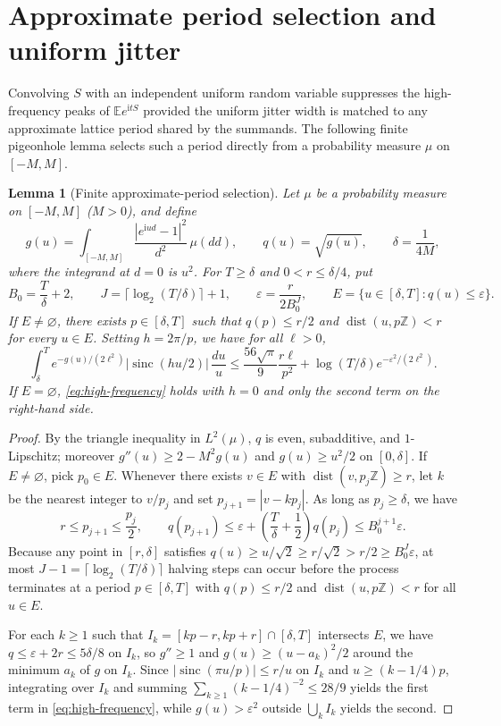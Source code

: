 \documentclass[11pt]{article}
\numberwithin{equation}{section}
\newtheorem{lemma}[theorem]{Lemma}
\theoremstyle{remark}
\DeclareMathOperator{\sinc}{sinc}
\DeclareMathOperator{\dist}{dist}
\newcommand{\E}{\mathbb E}
\newcommand{\Z}{\mathbb Z}
\newcommand{\eps}{\varepsilon}
\newcommand{\ii}{\mathrm i}
\begin{document}
\section{Approximate period selection and uniform jitter}\label{sec:jitter}

Convolving $S$ with an independent uniform random variable suppresses the
high-frequency peaks of $\E e^{\ii tS}$ provided the uniform jitter width is
matched to any approximate lattice period shared by the summands. The
following finite pigeonhole lemma selects such a period directly from a
probability measure $\mu$ on $[-M,M]$.

\begin{lemma}[Finite approximate-period selection]\label{lem:period}
Let $\mu$ be a probability measure on $[-M,M]$ ($M>0$), and define
\[
 g(u)=\int_{[-M,M]}\frac{|e^{\ii ud}-1|^2}{d^2}\,\mu(dd),\qquad
 q(u)=\sqrt{g(u)},\qquad\delta=\frac1{4M},
\]
where the integrand at $d=0$ is $u^2$. For $T\ge\delta$ and $0<r\le\delta/4$,
put
\[
 B_0=\frac T\delta+2,\qquad J=\lceil\log_2(T/\delta)\rceil+1,\qquad
 \eps=\frac r{2B_0^J},\qquad E=\{u\in[\delta,T]:q(u)\le\eps\}.
\]
If $E\ne\varnothing$, there exists $p\in[\delta,T]$ such that $q(p)\le r/2$
and $\dist(u,p\Z)<r$ for every $u\in E$. Setting $h=2\pi/p$, we have for all
$\ell>0$,
\begin{equation}\label{eq:high-frequency}
 \int_\delta^T e^{-g(u)/(2\ell^2)}|\sinc(hu/2)|\,\frac{du}{u}
 \le\frac{56\sqrt\pi}{9}\frac{r\ell}{p^2}
           +\log(T/\delta)e^{-\eps^2/(2\ell^2)}.
\end{equation}
If $E=\varnothing$, \eqref{eq:high-frequency} holds with $h=0$ and only the
second term on the right-hand side.
\end{lemma}
\begin{proof}
By the triangle inequality in $L^2(\mu)$, $q$ is even, subadditive, and
$1$-Lipschitz; moreover $g''(u)\ge2-M^2g(u)$ and $g(u)\ge u^2/2$ on
$[0,\delta]$. If $E\ne\varnothing$, pick $p_0\in E$. Whenever there exists
$v\in E$ with $\dist(v,p_j\Z)\ge r$, let $k$ be the nearest integer to
$v/p_j$ and set $p_{j+1}=|v-kp_j|$. As long as $p_j\ge\delta$, we have
\[
 r\le p_{j+1}\le \frac{p_j}2,\qquad
 q(p_{j+1})\le\eps+\left(\frac T\delta+\frac12\right)q(p_j)\le B_0^{j+1}\eps.
\]
Because any point in $[r,\delta]$ satisfies $q(u)\ge u/\sqrt2\ge r/\sqrt2>r/2\ge B_0^J\eps$,
at most $J-1=\lceil\log_2(T/\delta)\rceil$ halving steps can occur before the
process terminates at a period $p\in[\delta,T]$ with $q(p)\le r/2$ and
$\dist(u,p\Z)<r$ for all $u\in E$.

For each $k\ge1$ such that $I_k=[kp-r,kp+r]\cap[\delta,T]$ intersects $E$,
we have $q\le\eps+2r\le5\delta/8$ on $I_k$, so $g''\ge1$ and
$g(u)\ge(u-a_k)^2/2$ around the minimum $a_k$ of $g$ on $I_k$. Since
$|\sinc(\pi u/p)|\le r/u$ on $I_k$ and $u\ge(k-1/4)p$, integrating over
$I_k$ and summing $\sum_{k\ge1}(k-1/4)^{-2}\le28/9$ yields the first term in
\eqref{eq:high-frequency}, while $g(u)>\eps^2$ outside $\bigcup_k I_k$ yields
the second.
\end{proof}
\end{document}
